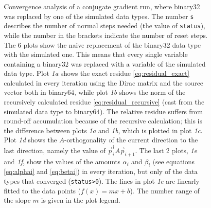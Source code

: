 \documentclass{article}
\theoremstyle{plain} %
\theoremstyle{convention} %
\theoremstyle{remark} %
\def\code#1{\texttt{#1}}
\numberwithin{equation}{section}
\begin{document}
\begin{figure}
    \caption{Convergence analysis of a conjugate gradient run, where \gls{binary32} was replaced by one of the simulated data types. The number \code{s} describes the number of normal steps needed (the value of \code{status}), while the number in the brackets indicate the number of reset steps. The 6 plots show the naive replacement of the \gls{binary32} data type with the simulated one. This means that every single variable containing a \gls{binary32} was replaced with a variable of the simulated data type. Plot \textit{1a} shows the exact residue \eqref{eq:residual_exact} calculated in every iteration using the Dirac matrix and the source vector both in \gls{binary64}, while plot \textit{1b} shows the norm of the recursively calculated residue \eqref{eq:residual_recursive} (cast from the simulated data type to \gls{binary64}). The relative residue suffers from round-off accumulation because of the recursive calculation; this is the difference between plots \textit{1a} and \textit{1b}, which is plotted in plot \textit{1c}. Plot \textit{1d} shows the $A$-orthogonality of the current direction to the last direction, namely the value of $\vec{p}_{i}^\dagger A \vec{p}_{i+1}$. The last 2 plots, \textit{1e} and \textit{1f}, show the values of the amounts $\alpha_i$ and $\beta_i$ (see equations \eqref{eq:alphai} and \eqref{eq:betai}) in every iteration, but only of the data types that converged (\code{status>0}). The lines in plot \textit{1e} are linearly fitted to the data points ($f(x) = m x + b$). The number range of the slope $m$ is given in the plot legend.}
    \label{fig:cgne:naive}
\end{figure}
\end{document}
